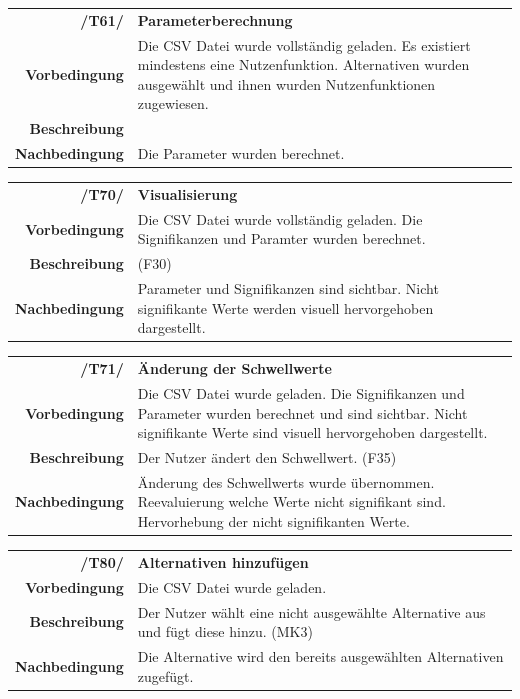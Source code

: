 \documentclass{article}
\begin{document}
\begin{table}[H]
\begin{tabularx}{\textwidth}{rX}
\textbf{/T61/}         & \textbf{Parameterberechnung} \\
\textbf{Vorbedingung}  & Die CSV Datei wurde vollständig geladen. Es existiert mindestens eine Nutzenfunktion. Alternativen wurden ausgewählt und ihnen wurden Nutzenfunktionen zugewiesen. \\
\textbf{Beschreibung}  &  \\
\textbf{Nachbedingung} & Die Parameter wurden berechnet.
\end{tabularx}
\end{table}

\begin{table}[H]
\begin{tabularx}{\textwidth}{rX}
\textbf{/T70/}         & \textbf{Visualisierung} \\
\textbf{Vorbedingung}  & Die CSV Datei wurde vollständig geladen. Die Signifikanzen und Paramter wurden berechnet. \\
\textbf{Beschreibung}  & (F30) \\
\textbf{Nachbedingung} & Parameter und Signifikanzen sind sichtbar. Nicht signifikante Werte werden visuell hervorgehoben dargestellt.
\end{tabularx}
\end{table}

\begin{table}[H]
\begin{tabularx}{\textwidth}{rX}
\textbf{/T71/}         & \textbf{Änderung der Schwellwerte} \\
\textbf{Vorbedingung}  & Die CSV Datei wurde geladen. Die Signifikanzen und Parameter wurden berechnet und sind sichtbar. Nicht signifikante Werte sind visuell hervorgehoben dargestellt.\\
\textbf{Beschreibung}  & Der Nutzer ändert den Schwellwert. (F35) \\
\textbf{Nachbedingung} & Änderung des Schwellwerts wurde übernommen. Reevaluierung welche Werte nicht signifikant sind. Hervorhebung der nicht signifikanten Werte.
\end{tabularx}
\end{table}

\begin{table}[H]
\begin{tabularx}{\textwidth}{rX}
\textbf{/T80/}         & \textbf{Alternativen hinzufügen} \\
\textbf{Vorbedingung}  & Die CSV Datei wurde geladen.\\
\textbf{Beschreibung}  & Der Nutzer wählt eine nicht ausgewählte Alternative aus und fügt diese hinzu. (MK3) \\
\textbf{Nachbedingung} & Die Alternative wird den bereits ausgewählten Alternativen zugefügt.
\end{tabularx}
\end{table}
\end{document}
